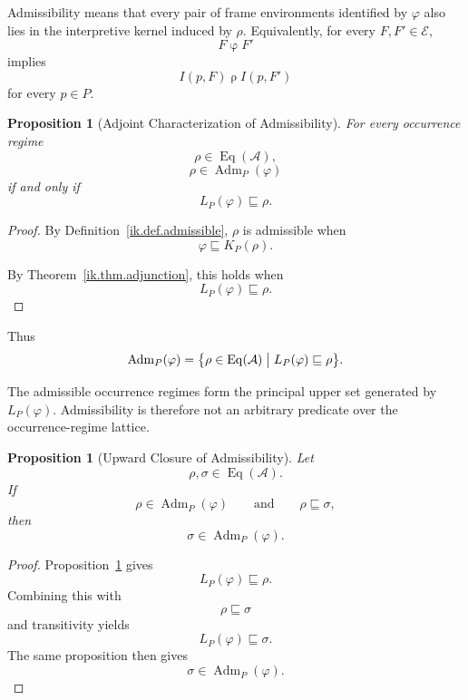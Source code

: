 \documentclass[11pt]{article}
\theoremstyle{plain}
\newtheorem{proposition}[theorem]{Proposition}
\theoremstyle{definition}
\theoremstyle{remark}
\begin{document}
Admissibility means that every pair of frame environments
identified by \(\varphi\)
also lies in the interpretive kernel induced by \(\rho\).
Equivalently,
for every \(F,F'\in\mathcal{E}\),
\[
  F\mathrel{\varphi}F'
\]
implies
\[
  I(p,F)\mathrel{\rho}I(p,F')
\]
for every \(p\in P\).

\begin{proposition}[Adjoint Characterization of Admissibility]
  \label{ik.prop.admissible-adjoint}
  For every occurrence regime
  \[
    \rho
    \in
    \operatorname{Eq}(\mathcal{A}),
  \]
  \[
    \rho
    \in
    \operatorname{Adm}_P(\varphi)
  \]
  if and only if
  \[
    L_P(\varphi)
    \sqsubseteq
    \rho.
  \]
\end{proposition}

\begin{proof}
  By Definition~\ref{ik.def.admissible},
  \(\rho\) is admissible when
  \[
    \varphi
    \sqsubseteq
    K_P(\rho).
  \]

  By Theorem~\ref{ik.thm.adjunction},
  this holds when
  \[
    L_P(\varphi)
    \sqsubseteq
    \rho.
  \]
\end{proof}

Thus
\[
  \operatorname{Adm}_P(\varphi)
  =
  \bigl\{
  \rho
  \in
  \operatorname{Eq}(\mathcal{A})
  \bigm|
  L_P(\varphi)
  \sqsubseteq
  \rho
  \bigr\}.
\]

The admissible occurrence regimes form
the principal upper set generated by \(L_P(\varphi)\).
Admissibility is therefore not an arbitrary predicate
over the occurrence-regime lattice.

\begin{proposition}[Upward Closure of Admissibility]
  \label{ik.prop.admissible-upward}
  Let
  \[
    \rho,\sigma
    \in
    \operatorname{Eq}(\mathcal{A}).
  \]
  If
  \[
    \rho
    \in
    \operatorname{Adm}_P(\varphi)
    \qquad\text{and}\qquad
    \rho
    \sqsubseteq
    \sigma,
  \]
  then
  \[
    \sigma
    \in
    \operatorname{Adm}_P(\varphi).
  \]
\end{proposition}

\begin{proof}
  Proposition~\ref{ik.prop.admissible-adjoint}
  gives
  \[
    L_P(\varphi)
    \sqsubseteq
    \rho.
  \]
  Combining this with
  \[
    \rho
    \sqsubseteq
    \sigma
  \]
  and transitivity yields
  \[
    L_P(\varphi)
    \sqsubseteq
    \sigma.
  \]
  The same proposition then gives
  \[
    \sigma
    \in
    \operatorname{Adm}_P(\varphi).
  \]
\end{proof}
\end{document}
